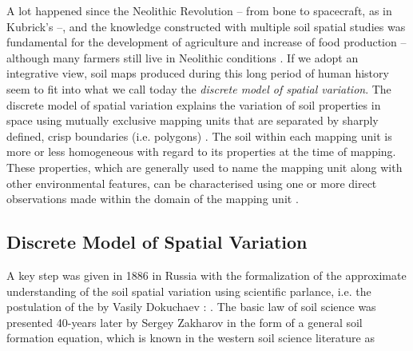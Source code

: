 
A lot happened since the Neolithic Revolution \cite{BrevikEtAl2010} -- from bone to spacecraft, as in 
Kubrick's \footKubrick{} --, and the knowledge constructed with multiple soil spatial studies was fundamental 
for the development of agriculture and increase of food production -- although many farmers still live in 
Neolithic conditions \cite{MazoyerEtAl2008}. If we adopt an integrative view, soil maps produced during this 
long period of human history seem to fit into what we call today the \emph{discrete model of spatial 
variation}. The discrete model of spatial variation explains the variation of soil properties in space 
using mutually exclusive mapping units that are separated by sharply defined, crisp boundaries (i.e. polygons) 
\cite{Heuvelink1996, Legros2006}. The soil\footsoil{} within each mapping unit is more or less homogeneous 
with regard to its properties at the time of mapping. These properties, which are generally used to name the 
mapping unit along with other environmental features, can be characterised using one or more direct 
observations made within the domain of the mapping unit \cite{WebsterEtAl1990, Rossiter2000, 
Legros2006}.

\subsection{Discrete Model of Spatial Variation}

A key step was given in 1886 in Russia with the formalization of the approximate understanding of the soil 
spatial variation using scientific parlance, i.e. the postulation of the  by 
Vasily Dokuchaev \cite{Florinsky2012}: . The basic law of soil science was presented 40-years later by Sergey Zakharov in the form of a 
general soil formation equation, which is known in the western soil science literature as \cite{Jenny1941, 
Florinsky2012}

